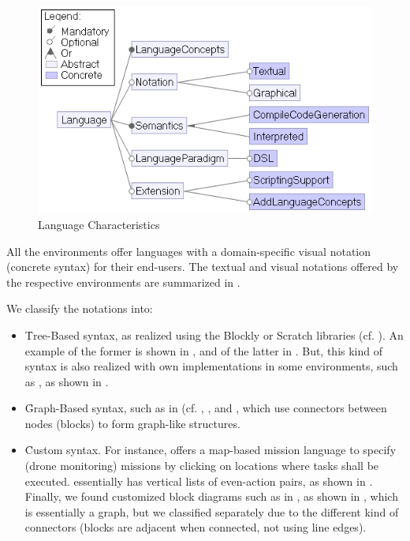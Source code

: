 \begin{figure}[t]
     \centering
    \includegraphics[width=.75\columnwidth]{Languagefeatures.png}
      \caption{Language Characteristics}
      \label{fig:languagefeatures}
   \end{figure}

 All the environments offer languages with a domain-specific visual notation (concrete syntax) for their end-users. The textual and visual notations offered by the respective environments are summarized in .

We classify the notations into:

\begin{itemize}
	\item \f{Tree-Based} syntax, as realized using the Blockly or Scratch libraries (cf. ). An example of the former is shown in , and of the latter in . But, this kind of syntax is also realized with own implementations in some environments, such as \robotc, as shown in .
	\item \f{Graph-Based} syntax, such as in \choregraphe (cf. , %
	\robotmesh, and %
	\picaxe, which use connectors between nodes (blocks) to form graph-like structures. 
	\item \f{Custom} syntax. For instance, \flyaq offers a map-based mission language to specify (drone monitoring) missions by clicking on locations where tasks shall be executed. \aseba essentially has vertical lists of even-action pairs, as shown in . Finally, we found customized block diagrams such as in \lego, as shown in , which is essentially a graph, but we classified separately due to the different kind of connectors (blocks are adjacent when connected, not using line edges).
\end{itemize}


